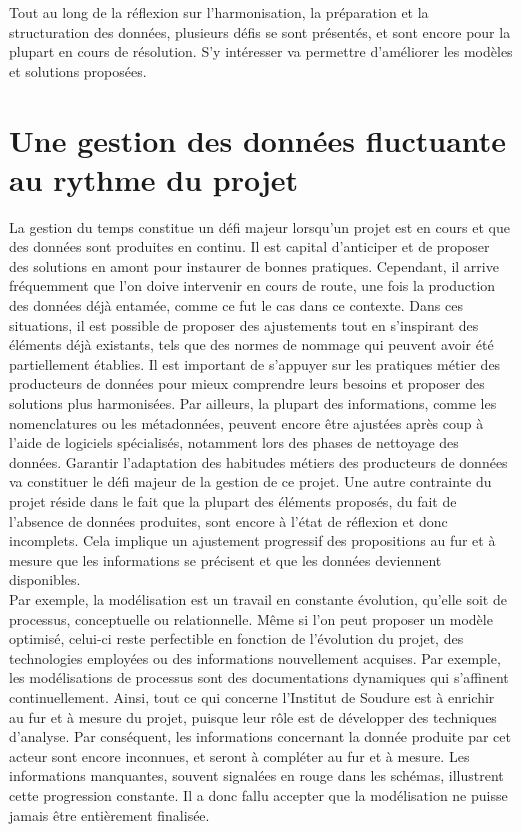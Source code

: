 
Tout au long de la réflexion sur l'harmonisation, la préparation et la structuration des données, plusieurs défis se sont présentés, et sont encore pour la plupart en cours de résolution. S'y intéresser va permettre d'améliorer les modèles et solutions proposées.

        \section{Une gestion des données fluctuante au rythme du projet}

La gestion du temps constitue un défi majeur lorsqu'un projet est en cours et que des données sont produites en continu. Il est capital d'anticiper et de proposer des solutions en amont pour instaurer de bonnes pratiques. Cependant, il arrive fréquemment que l'on doive intervenir en cours de route, une fois la production des données déjà entamée, comme ce fut le cas dans ce contexte. Dans ces situations, il est possible de proposer des ajustements tout en s’inspirant des éléments déjà existants, tels que des normes de nommage qui peuvent avoir été partiellement établies. Il est important de s’appuyer sur les pratiques métier des producteurs de données pour mieux comprendre leurs besoins et proposer des solutions plus harmonisées. Par ailleurs, la plupart des informations, comme les nomenclatures ou les métadonnées, peuvent encore être ajustées après coup à l’aide de logiciels spécialisés, notamment lors des phases de nettoyage des données. Garantir l’adaptation des habitudes métiers des producteurs de données va constituer le défi majeur de la gestion de ce projet. Une autre contrainte du projet réside dans le fait que la plupart des éléments proposés, du fait de l’absence de données produites, sont encore à l’état de réflexion et donc incomplets. Cela implique un ajustement progressif des propositions au fur et à mesure que les informations se précisent et que les données deviennent disponibles.\\

Par exemple, la modélisation est un travail en constante évolution, qu’elle soit de processus, conceptuelle ou relationnelle. Même si l’on peut proposer un modèle optimisé, celui-ci reste perfectible en fonction de l’évolution du projet, des technologies employées ou des informations nouvellement acquises. Par exemple, les modélisations de processus sont des documentations dynamiques qui s’affinent continuellement. Ainsi, tout ce qui concerne l’Institut de Soudure est à enrichir au fur et à mesure du projet, puisque leur rôle est de développer des techniques d’analyse. Par conséquent, les informations concernant la donnée produite par cet acteur sont encore inconnues, et seront à compléter au fur et à mesure. Les informations manquantes, souvent signalées en rouge dans les schémas, illustrent cette progression constante. Il a donc fallu accepter que la modélisation ne puisse jamais être entièrement finalisée.

